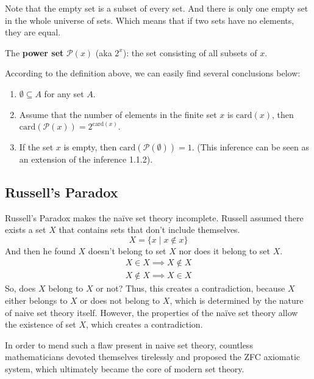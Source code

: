 Note that the empty set is a subset of every set. And there is only one empty set in the whole universe of sets. Which means that if two sets have no elements, they are equal.

\begin{definition}
The \textbf{power set} $\mathcal{P}(x)$ (aka $2^{x}$): the set consisting of all subsets of $x$.
\end{definition}

According to the definition above, we can easily find several conclusions below:
\begin{inference}
\begin{enumerate}

\item $\emptyset \subseteq A$ for any set $A$.

\item Assume that the number of elements in the finite set $x$ is $\text{card}(x)$, then $\text{card}(\mathcal{P}(x)) = 2^{\text{card}(x)}$.

\item If the set $x$ is empty, then $\text{card}(\mathcal{P}(\emptyset)) = 1$. (This inference can be seen as an extension of the inference 1.1.2).

\end{enumerate}
\end{inference}

\subsection*{Russell’s Paradox}
Russell’s Paradox makes the naïve set theory incomplete. Russell assumed there exists a set $X$ that contains sets that don’t include themselves.
$$ X = \{ x \mid x \notin x \} $$
And then he found $X$ doesn't belong to set $X$ nor does it belong to set $X$.
\begin{align*}
    X \in X \implies X \notin X \\
    X \notin X \implies X \in X
\end{align*}
So, does $X$ belong to $X$ or not? Thus, this creates a contradiction, because $X$ either belongs to $X$ or does not belong to $X$, which is determined by the nature of naive set theory itself. However, the properties of the naïve set theory allow the existence of set $X$, which creates a contradiction.

In order to mend such a flaw present in naive set theory, countless mathematicians devoted themselves tirelessly and proposed the ZFC axiomatic system, which ultimately became the core of modern set theory.

